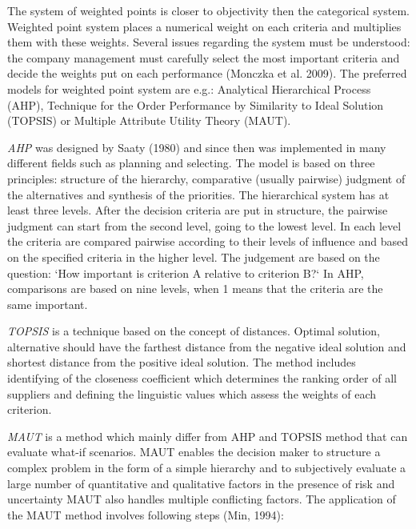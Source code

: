\documentclass[oneside,12pt]{article}%
\begin{document}
The system of weighted points is closer to objectivity then the categorical system. Weighted point system places a numerical weight on each criteria and multiplies them with these weights. Several issues regarding the system must be understood: the company management must carefully select the most important criteria and decide the weights put on each performance (Monczka et al. 2009). The preferred models for weighted point system are e.g.: Analytical Hierarchical Process (AHP), Technique for the Order Performance by Similarity to Ideal Solution (TOPSIS) or Multiple Attribute Utility Theory (MAUT).\par
\emph{AHP} was designed by Saaty (1980) and since then was implemented in many different fields such as planning and selecting. The model is based on three principles: structure of the hierarchy, comparative (usually pairwise) judgment of the alternatives and synthesis of the priorities. The hierarchical system has at least three levels. After the decision criteria are put in structure, the pairwise judgment can start from the second level, going to the lowest level. In each level the criteria are compared pairwise according to their levels of influence and based on the specified criteria in the higher level. The judgement are based on the question: ‘How important is criterion A relative to criterion B?‘ In AHP, comparisons are based on nine levels, when 1 means that the criteria are the same important. \par
\emph{TOPSIS} is a technique based on the concept of distances. Optimal solution, alternative should have the farthest distance from the negative ideal solution and shortest distance from the positive ideal solution. The method includes identifying of the closeness coefficient which determines the ranking order of all suppliers and defining the linguistic values which assess the weights of each criterion. \par
\emph{MAUT} is a method which mainly differ from AHP and TOPSIS method that can evaluate what-if scenarios. MAUT enables the decision maker to structure a complex problem in the form of a simple hierarchy and to subjectively evaluate a large number of quantitative and qualitative factors in the presence of risk and uncertainty MAUT also handles multiple conflicting factors. The application of the MAUT method involves following steps (Min, 1994):
\end{document}
